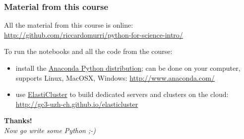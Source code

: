 \documentclass[english,serif,mathserif,xcolor=pdftex,dvipsnames,table]{beamer}
\begin{document}
\begin{frame}
  \frametitle{Material from this course}
  \small
  All the material from this course is online:
  \url{http://github.com/riccardomurri/python-for-science-intro/}

  \+
  To run the notebooks and all the code from the course:
  \begin{itemize}
  \item install the \href{http://www.anaconda.com/}{Anaconda Python
      distribution}; can be done on your computer, supports Linux,
    MacOSX, Windows: \url{http://www.anaconda.com/}
  \item use
    \href{http://gc3-uzh-ch.github.io/elasticluster}{ElastiCluster} to
    build dedicated servers and clusters on the cloud:
    \url{http://gc3-uzh-ch.github.io/elasticluster}
  \end{itemize}

\end{frame}






\begin{frame}
  \begin{center}
    {\Huge\bfseries Thanks!}
    \\[2em]
    {\large\itshape\color{gray} Now go write some Python ;-)}
  \end{center}
\end{frame}
\end{document}
